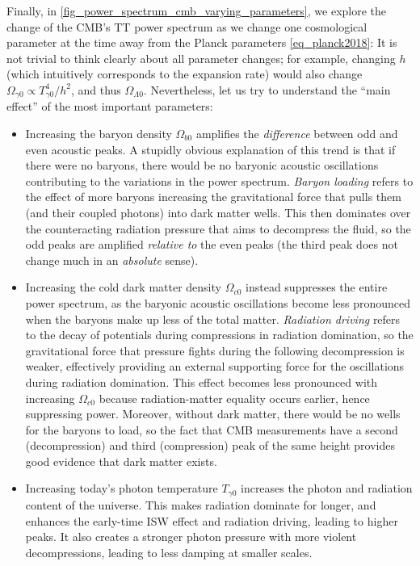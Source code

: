 \documentclass[10pt,a4paper]{article}
\begin{document}
Finally, in \cref{fig_power_spectrum_cmb_varying_parameters},
we explore the change of the CMB's TT power spectrum as we change one cosmological parameter at the time away from the Planck parameters \eqref{eq_planck2018}:
It is not trivial to think clearly about all parameter changes;
for example, changing $h$ (which intuitively corresponds to the expansion rate) would also change $\Omega_{\gamma 0} \propto T_{\gamma 0}^4/h^{2}$, and thus $\Omega_{\Lambda 0}$.
Nevertheless, let us try to understand the ``main effect'' of the most important parameters:
\begin{itemize}
\item
Increasing the baryon density $\Omega_{b0}$ amplifies the \emph{difference} between odd and even acoustic peaks.
A stupidly obvious explanation of this trend is that if there were no baryons,
there would be no baryonic acoustic oscillations
contributing to the variations in the power spectrum.
\emph{Baryon loading} refers to the effect of more baryons
increasing the gravitational force that pulls them (and their coupled photons) into dark matter wells.
This then dominates over the counteracting radiation pressure that aims to decompress the fluid,
so the odd peaks are amplified \emph{relative to} the even peaks (the third peak does not change much in an \emph{absolute} sense).

\item
Increasing the cold dark matter density $\Omega_{c0}$ instead suppresses the entire power spectrum,
as the baryonic acoustic oscillations become less pronounced when the baryons make up less of the total matter.
\emph{Radiation driving} refers to the decay of potentials during compressions in radiation domination,
so the gravitational force that pressure fights during the following decompression is weaker,
effectively providing an external supporting force for the oscillations during radiation domination.
This effect becomes less pronounced with increasing $\Omega_{c0}$ because radiation-matter equality occurs earlier,
hence suppressing power.
Moreover, without dark matter, there would be no wells for the baryons to load,
so the fact that CMB measurements have a second (decompression) and third (compression) peak of the same height
provides good evidence that dark matter exists.

\item
Increasing today's photon temperature $T_{\gamma 0}$ increases the photon and radiation content of the universe.
This makes radiation dominate for longer,
and enhances the early-time ISW effect and radiation driving,
leading to higher peaks.
It also creates a stronger photon pressure with more violent decompressions,
leading to less damping at smaller scales.


\end{itemize}
\end{document}
